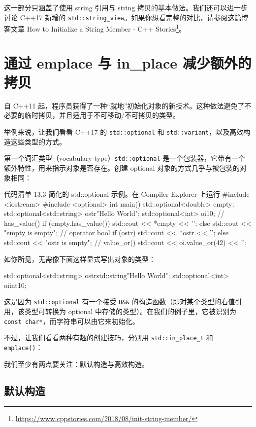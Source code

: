 这一部分只涵盖了使用 string 引用与 string 拷贝的基本做法。我们还可以进一步讨论 C++17 新增的 \texttt{std::string\_view}。如果你想看完整的对比，请参阅这篇博客文章 How to Initialize a String Member - C++ Stories\footnote{\url{https://www.cppstories.com/2018/08/init-string-member/}}。

\section{通过 emplace 与 in\_place 减少额外的拷贝}

自 C++11 起，程序员获得了一种“就地”初始化对象的新技术。这种做法避免了不必要的临时拷贝，并且适用于不可移动/不可拷贝的类型。


举例来说，让我们看看 C++17 的 \texttt{std::optional} 和 \texttt{std::variant}，以及高效构造这些类型的方式。

第一个词汇类型（vocabulary type）\texttt{std::optional} 是一个包装器，它带有一个额外特性，用来指示对象是否存在。创建 optional 对象的方式几乎与被包装的对象相同：

\begin{codeboxt}[cpp]{代码清单 13.3 简化的 std::optional 示例。在 Compiler Explorer 上运行}
#include <iostream>
#include <optional>
int main() {
std::optional<double> empty;
std::optional<std::string> ostr{"Hello World"};
std::optional<int> oi{10};
// has_value()
if (empty.has_value()) std::cout << *empty << '\n';
else std::cout << "empty is empty\n";
// operator bool
if (ostr) std::cout << *ostr << '\n';
else std::cout << "ostr is empty\n";
// value_or()
std::cout << oi.value_or(42) << '\n';
}
\end{codeboxt}

如你所见，无需像下面这样显式写出对象的类型：

\begin{codebox}[cpp]
std::optional<std::string> ostr{std::string{"Hello World"}};
std::optional<int> oi{int{10}};
\end{codebox}

这是因为 \texttt{std::optional} 有一个接受 \texttt{U\&\&} 的构造函数（即对某个类型的右值引用，该类型可转换为 optional 中存储的类型）。在我们的例子里，它被识别为 \texttt{const char*}，而字符串可以由它来初始化。

不过，让我们看看两种有趣的创建技巧，分别用 \texttt{std::in\_place\_t} 和 \texttt{emplace()}：

我们至少有两点要关注：默认构造与高效构造。

\subsection{默认构造}

